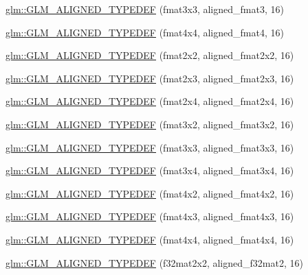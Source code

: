 \begin{DoxyCompactItemize}
\item 
\hyperlink{group__gtx__type__aligned_ga6e7ee4f541e1d7db66cd1a224caacafb}{glm\-::\-G\-L\-M\-\_\-\-A\-L\-I\-G\-N\-E\-D\-\_\-\-T\-Y\-P\-E\-D\-E\-F} (fmat3x3, aligned\-\_\-fmat3, 16)
\item 
\hyperlink{group__gtx__type__aligned_gae5d672d359f2a39f63f98c7975057486}{glm\-::\-G\-L\-M\-\_\-\-A\-L\-I\-G\-N\-E\-D\-\_\-\-T\-Y\-P\-E\-D\-E\-F} (fmat4x4, aligned\-\_\-fmat4, 16)
\item 
\hyperlink{group__gtx__type__aligned_ga6fa2df037dbfc5fe8c8e0b4db8a34953}{glm\-::\-G\-L\-M\-\_\-\-A\-L\-I\-G\-N\-E\-D\-\_\-\-T\-Y\-P\-E\-D\-E\-F} (fmat2x2, aligned\-\_\-fmat2x2, 16)
\item 
\hyperlink{group__gtx__type__aligned_ga0743b4f4f69a3227b82ff58f6abbad62}{glm\-::\-G\-L\-M\-\_\-\-A\-L\-I\-G\-N\-E\-D\-\_\-\-T\-Y\-P\-E\-D\-E\-F} (fmat2x3, aligned\-\_\-fmat2x3, 16)
\item 
\hyperlink{group__gtx__type__aligned_ga1a76b325fdf70f961d835edd182c63dd}{glm\-::\-G\-L\-M\-\_\-\-A\-L\-I\-G\-N\-E\-D\-\_\-\-T\-Y\-P\-E\-D\-E\-F} (fmat2x4, aligned\-\_\-fmat2x4, 16)
\item 
\hyperlink{group__gtx__type__aligned_ga4b4e181cd041ba28c3163e7b8074aef0}{glm\-::\-G\-L\-M\-\_\-\-A\-L\-I\-G\-N\-E\-D\-\_\-\-T\-Y\-P\-E\-D\-E\-F} (fmat3x2, aligned\-\_\-fmat3x2, 16)
\item 
\hyperlink{group__gtx__type__aligned_ga27b13f465abc8a40705698145e222c3f}{glm\-::\-G\-L\-M\-\_\-\-A\-L\-I\-G\-N\-E\-D\-\_\-\-T\-Y\-P\-E\-D\-E\-F} (fmat3x3, aligned\-\_\-fmat3x3, 16)
\item 
\hyperlink{group__gtx__type__aligned_ga2608d19cc275830a6f8c0b6405625a4f}{glm\-::\-G\-L\-M\-\_\-\-A\-L\-I\-G\-N\-E\-D\-\_\-\-T\-Y\-P\-E\-D\-E\-F} (fmat3x4, aligned\-\_\-fmat3x4, 16)
\item 
\hyperlink{group__gtx__type__aligned_ga93f09768241358a287c4cca538f1f7e7}{glm\-::\-G\-L\-M\-\_\-\-A\-L\-I\-G\-N\-E\-D\-\_\-\-T\-Y\-P\-E\-D\-E\-F} (fmat4x2, aligned\-\_\-fmat4x2, 16)
\item 
\hyperlink{group__gtx__type__aligned_ga7c117e3ecca089e10247b1d41d88aff9}{glm\-::\-G\-L\-M\-\_\-\-A\-L\-I\-G\-N\-E\-D\-\_\-\-T\-Y\-P\-E\-D\-E\-F} (fmat4x3, aligned\-\_\-fmat4x3, 16)
\item 
\hyperlink{group__gtx__type__aligned_ga07c75cd04ba42dc37fa3e105f89455c5}{glm\-::\-G\-L\-M\-\_\-\-A\-L\-I\-G\-N\-E\-D\-\_\-\-T\-Y\-P\-E\-D\-E\-F} (fmat4x4, aligned\-\_\-fmat4x4, 16)
\item 
\hyperlink{group__gtx__type__aligned_ga65ff0d690a34a4d7f46f9b2eb51525ee}{glm\-::\-G\-L\-M\-\_\-\-A\-L\-I\-G\-N\-E\-D\-\_\-\-T\-Y\-P\-E\-D\-E\-F} (f32mat2x2, aligned\-\_\-f32mat2, 16)

\end{DoxyCompactItemize}
